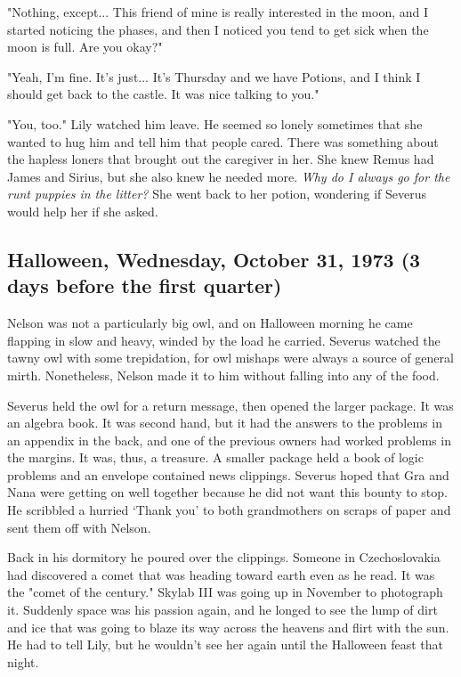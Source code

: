 \documentclass[a4paper,11pt]{article}
\begin{document}
"Nothing, except... This friend of mine is really interested in the moon, and I started noticing the phases, and then I noticed you tend to get sick when the moon is full. Are you okay?"

"Yeah, I'm fine. It's just... It's Thursday and we have Potions, and I think I should get back to the castle. It was nice talking to you."

"You, too." Lily watched him leave. He seemed so lonely sometimes that she wanted to hug him and tell him that people cared. There was something about the hapless loners that brought out the caregiver in her. She knew Remus had James and Sirius, but she also knew he needed more. \emph{Why do I always go for the runt puppies in the litter?} She went back to her potion, wondering if Severus would help her if she asked.

\subsection{Halloween, Wednesday, October 31, 1973 (3 days before the first quarter)}

Nelson was not a particularly big owl, and on Halloween morning he came flapping in slow and heavy, winded by the load he carried. Severus watched the tawny owl with some trepidation, for owl mishaps were always a source of general mirth. Nonetheless, Nelson made it to him without falling into any of the food.

Severus held the owl for a return message, then opened the larger package. It was an algebra book. It was second hand, but it had the answers to the problems in an appendix in the back, and one of the previous owners had worked problems in the margins. It was, thus, a treasure. A smaller package held a book of logic problems and an envelope contained news clippings. Severus hoped that Gra and Nana were getting on well together because he did not want this bounty to stop. He scribbled a hurried `Thank you' to both grandmothers on scraps of paper and sent them off with Nelson.

Back in his dormitory he poured over the clippings. Someone in Czechoslovakia had discovered a comet that was heading toward earth even as he read. It was the "comet of the century." Skylab III was going up in November to photograph it. Suddenly space was his passion again, and he longed to see the lump of dirt and ice that was going to blaze its way across the heavens and flirt with the sun. He had to tell Lily, but he wouldn't see her again until the Halloween feast that night.
\end{document}
